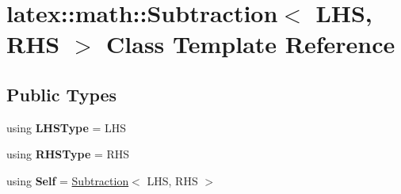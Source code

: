 \hypertarget{classlatex_1_1math_1_1Subtraction}{\section{latex\-:\-:math\-:\-:Subtraction$<$ L\-H\-S, R\-H\-S $>$ Class Template Reference}
\label{classlatex_1_1math_1_1Subtraction}
}
\subsection*{Public Types}
\begin{DoxyCompactItemize}
\item 
\hypertarget{classlatex_1_1math_1_1Subtraction_a5d8b7f9b0573d7063f1b117f2eea4da6}{using {\bfseries L\-H\-S\-Type} = L\-H\-S}\label{classlatex_1_1math_1_1Subtraction_a5d8b7f9b0573d7063f1b117f2eea4da6}

\item 
\hypertarget{classlatex_1_1math_1_1Subtraction_a41805a0e9b8af712e04330fafc0f06b8}{using {\bfseries R\-H\-S\-Type} = R\-H\-S}\label{classlatex_1_1math_1_1Subtraction_a41805a0e9b8af712e04330fafc0f06b8}

\item 
\hypertarget{classlatex_1_1math_1_1Subtraction_a63cdfe10b155598b1adf4358268cbc6d}{using {\bfseries Self} = \hyperlink{classlatex_1_1math_1_1Subtraction}{Subtraction}$<$ L\-H\-S, R\-H\-S $>$}\label{classlatex_1_1math_1_1Subtraction_a63cdfe10b155598b1adf4358268cbc6d}

\end{DoxyCompactItemize}

